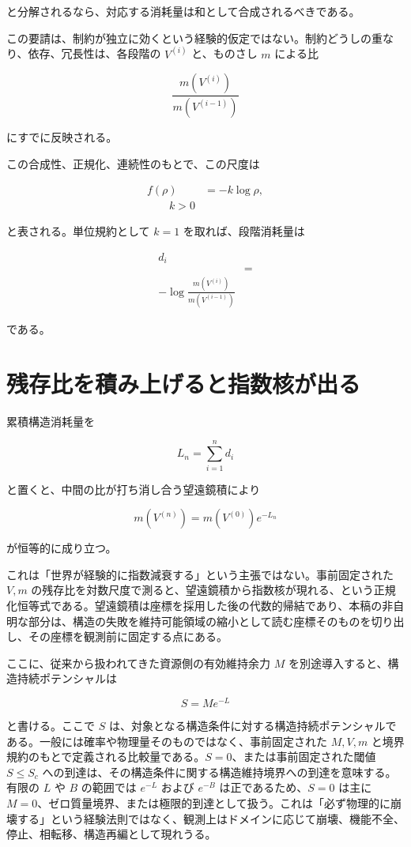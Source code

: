 \documentclass[12pt,a4paper]{article}
\begin{document}
と分解されるなら、対応する消耗量は和として合成されるべきである。

この要請は、制約が独立に効くという経験的仮定ではない。制約どうしの重なり、依存、冗長性は、各段階の \(V^{(i)}\) と、ものさし \(m\) による比

\[
\frac{m(V^{(i)})}{m(V^{(i-1)})}
\]

にすでに反映される。

この合成性、正規化、連続性のもとで、この尺度は

\[
\begin{aligned}
f(\rho)&=-k\log \rho, \\
\qquad k>0
\end{aligned}
\]

と表される。単位規約として \(k=1\) を取れば、段階消耗量は

\[
\begin{aligned}
d_{i} \\
&= \\
-\log\frac{m(V^{(i)})}{m(V^{(i-1)})}
\end{aligned}
\]

である。

\section{残存比を積み上げると指数核が出る}\label{ux6b8bux5b58ux6bd4ux3092ux7a4dux307fux4e0aux3052ux308bux3068ux6307ux6570ux6838ux304cux51faux308b}

累積構造消耗量を

\[
L_{n}=\sum_{i=1}^{n} d_{i}
\]

と置くと、中間の比が打ち消し合う望遠鏡積により

\[
m(V^{(n)})=m(V^{(0)})e^{-L_{n}}
\]

が恒等的に成り立つ。

これは「世界が経験的に指数減衰する」という主張ではない。事前固定された \(V,m\) の残存比を対数尺度で測ると、望遠鏡積から指数核が現れる、という正規化恒等式である。望遠鏡積は座標を採用した後の代数的帰結であり、本稿の非自明な部分は、構造の失敗を維持可能領域の縮小として読む座標そのものを切り出し、その座標を観測前に固定する点にある。

ここに、従来から扱われてきた資源側の有効維持余力 \(M\) を別途導入すると、構造持続ポテンシャルは

\[
S=Me^{-L}
\]

と書ける。ここで \(S\) は、対象となる構造条件に対する構造持続ポテンシャルである。一般には確率や物理量そのものではなく、事前固定された \(M,V,m\) と境界規約のもとで定義される比較量である。\(S=0\)、または事前固定された閾値 \(S\le S_{c}\) への到達は、その構造条件に関する構造維持境界への到達を意味する。有限の \(L\) や \(B\) の範囲では \(e^{-L}\) および \(e^{-B}\) は正であるため、\(S=0\) は主に \(M=0\)、ゼロ質量境界、または極限的到達として扱う。これは「必ず物理的に崩壊する」という経験法則ではなく、観測上はドメインに応じて崩壊、機能不全、停止、相転移、構造再編として現れうる。
\end{document}
